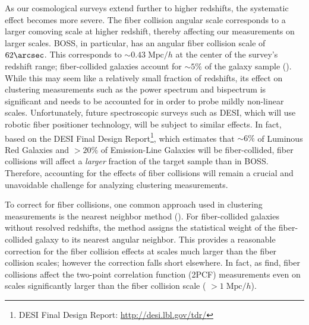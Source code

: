 As our cosmological surveys extend further to higher redshifts, the systematic
effect becomes more severe. The fiber collision angular scale corresponds 
to a larger comoving scale at higher redshift, thereby affecting our measurements on larger 
scales. BOSS, in particular, has an angular fiber collision scale 
of $62\arcsec$. This corresponds to $\sim 0.43 \;\mathrm{Mpc}/h$ at the 
center of the survey's redshift range; fiber-collided galaxies 
account for $\sim 5\%$ of the galaxy sample (\citealt{Anderson:2012aa, 
Reid:2012aa, Guo:2012aa}). 
While this may seem like a relatively small fraction of redshifts, its 
effect on clustering measurements such as the power spectrum and bispectrum 
is significant and needs to be accounted for in order to probe mildly non-linear scales. 
Unfortunately, future spectroscopic surveys such 
as DESI, which will use robotic fiber positioner 
technology, will be subject to similar effects. 
In fact, based on the DESI Final Design 
Report\footnote{DESI Final Design Report: \url{http://desi.lbl.gov/tdr/}}, which estimates that 
$\sim 6\%$ of Luminous Red Galaxies and 
$>20\%$ of Emission-Line Galaxies will be fiber-collided, 
fiber collisions will affect a {\em larger} fraction of the target 
sample than in BOSS.
Therefore, 
accounting for the effects of fiber collisions will remain a crucial and 
unavoidable challenge for analyzing clustering measurements. 

%

To correct for fiber collisions, one common approach used in clustering 
measurements is the nearest neighbor method (\citealt{Zehavi:2002aa, Zehavi:2005aa, 
Zehavi:2011aa, Berlind:2006aa, Anderson:2012aa}). For fiber-collided galaxies without 
resolved redshifts, the method assigns the statistical weight of the 
fiber-collided galaxy to its nearest angular neighbor. This provides 
a reasonable correction for the fiber collision effects at scales much 
larger than the fiber collision scales; however the correction falls short 
elsewhere. In fact, as \cite{Zehavi:2005aa} find, 
fiber collisions affect the two-point correlation function (2PCF) 
measurements even on scales significantly larger than the fiber collision 
scale ( $> 1\;\mathrm{Mpc}/h$). 


